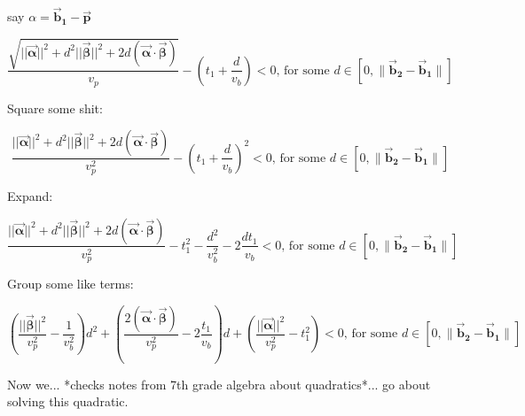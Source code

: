 \documentclass[11pt]{article} %
\begin{document}
say $\alpha = \bm{\vec{b}_1} - \bm{\vec{p}}$

$$ \frac{ \sqrt{ ||\bm{\vec{\alpha}}||^2 + d^2||\bm{\vec{\beta}}||^2 + 2d(\bm{\vec{\alpha}} \cdot \bm{\vec{\beta}}) }} {v_p} - \left(t_1 + \frac{d}{v_b}\right) < 0 \mbox{, for some } d \in [0,  \|\bm{\vec{b}_2} - \bm{\vec{b}_1}\|] $$

Square some shit:

$$ \frac{ ||\bm{\vec{\alpha}}||^2 + d^2||\bm{\vec{\beta}}||^2 + 2d(\bm{\vec{\alpha}} \cdot \bm{\vec{\beta}}) } {v_p^2} - \left(t_1 + \frac{d}{v_b}\right)^2 < 0 \mbox{, for some } d \in [0,  \|\bm{\vec{b}_2} - \bm{\vec{b}_1}\|] $$

Expand:

$$ \frac{ ||\bm{\vec{\alpha}}||^2 + d^2||\bm{\vec{\beta}}||^2 + 2d(\bm{\vec{\alpha}} \cdot \bm{\vec{\beta}}) } {v_p^2} - t_1^2 - \frac{d^2}{v_b^2} - 2 \frac{dt_1}{v_b} < 0 \mbox{, for some } d \in [0,  \|\bm{\vec{b}_2} - \bm{\vec{b}_1}\|] $$

Group some like terms:

$$ \left(\frac{||\bm{\vec{\beta}}||^2}{v_p^2}  - \frac{1}{v_b^2}\right) d^2 + 
\left(\frac{2(\bm{\vec{\alpha}} \cdot \bm{\vec{\beta}}) } {v_p^2} - 2 \frac{t_1}{v_b}\right) d +
\left(\frac{ ||\bm{\vec{\alpha}}||^2}{v_p^2} - t_1^2 \right)
  < 0 \mbox{, for some } d \in [0,  \|\bm{\vec{b}_2} - \bm{\vec{b}_1}\|] $$

Now we... *checks notes from 7th grade algebra about quadratics*... go about solving this quadratic. 
\end{document}
